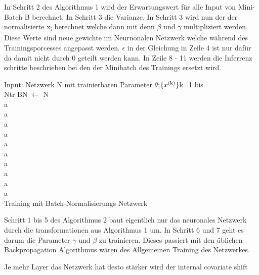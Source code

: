 \documentclass{llncs}
\begin{document}
In Schritt 2 des Algorithmus 1 wird der Erwartungswert für alle Input von Mini-Batch B berechnet. In Schritt 3 die Varianze. In Schritt 3 wird nun der der normalisierte x\textsubscript{i} berechnet welche dann mit denn $\beta$ und $\gamma$ multipliziert werden. Diese Werte sind neue gewichte im Neurnonalen Netzwerk welche während des Trainingsporcesses angepasst werden. $\epsilon$ in der Gleichung in Zeile 4 ist nur dafür da damit nicht durch 0 geteilt werden kann. In Zeile 8 - 11 werden die Inferrenz schritte beschrieben bei den der Minibatch des Trainings ersetzt wird. 

\begin{algorithm}[H]
	Input: Netzwerk N mit trainierbaren Parameter $\theta$;$\{x\textsuperscript{(k)}\}$k=1 bis 	
	\\	
	Ntr BN $\leftarrow$ N	
	\\a\\a\\a\\a\\a\\a\\a\\a\\a\\a\\

	\caption{Training mit Batch-Normalisierungs Netzwerk}	
\end{algorithm}

Schritt 1 bis 5 des Algorithmus 2 baut eigentlich nur das neuronales Netzwerk durch die transformationen aus Algorithmus 1 um. In Schritt 6 und 7 geht es darum die Parameter $\gamma$ und $\beta$ zu trainieren. Dieses passiert mit den üblichen Backpropagation Algorithmus wären des Allgemeinen Training des Netzwerkes. 


Je mehr Layer das Netzwerk hat desto stärker wird der internal covariate shift
\end{document}
